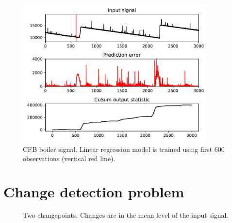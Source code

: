 \begin{figure}[!htb]
	\centering
	\includegraphics[width=0.9\textwidth]{images/boiler_fixed_train}
	\caption{CFB boiler signal.
Linear regression model is trained using first 600 observations (vertical red line).	
}\label{fig:boiler_fixed_train}
\end{figure}

\section{Change detection problem}


\begin{figure}[!htb]
	\centering
	
	\caption{Two changepoints. Changes are in the mean level of the input signal.}\label{fig:change_example}
\end{figure}


